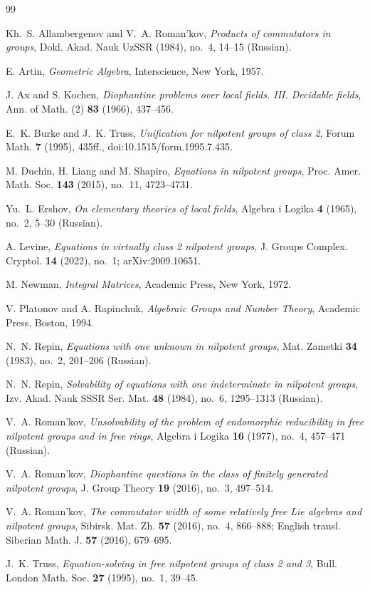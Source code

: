 \documentclass[11pt]{amsart}
\theoremstyle{definition}
\theoremstyle{remark}
\begin{document}
\begin{thebibliography}{99}

Kh.~S. Allambergenov and V.~A. Roman'kov, \emph{Products of commutators in groups},
Dokl. Akad. Nauk UzSSR (1984), no.~4, 14--15 (Russian).

E. Artin, \emph{Geometric Algebra}, Interscience, New York, 1957.

J. Ax and S. Kochen, \emph{Diophantine problems over local fields. III. Decidable
fields}, Ann. of Math. (2) \textbf{83} (1966), 437--456.

E.~K. Burke and J.~K. Truss, \emph{Unification for nilpotent groups of class 2},
Forum Math. \textbf{7} (1995), 435ff., doi:10.1515/form.1995.7.435.

M. Duchin, H. Liang and M. Shapiro, \emph{Equations in nilpotent groups},
Proc. Amer. Math. Soc. \textbf{143} (2015), no.~11, 4723--4731.

Yu.~L. Ershov, \emph{On elementary theories of local fields}, Algebra i Logika
\textbf{4} (1965), no.~2, 5--30 (Russian).

A. Levine, \emph{Equations in virtually class 2 nilpotent groups}, J. Groups
Complex. Cryptol. \textbf{14} (2022), no.~1; arXiv:2009.10651.

M. Newman, \emph{Integral Matrices}, Academic Press, New York, 1972.

V. Platonov and A. Rapinchuk, \emph{Algebraic Groups and Number Theory},
Academic Press, Boston, 1994.

N.~N. Repin, \emph{Equations with one unknown in nilpotent groups}, Mat. Zametki
\textbf{34} (1983), no.~2, 201--206 (Russian).

N.~N. Repin, \emph{Solvability of equations with one indeterminate in nilpotent
groups}, Izv. Akad. Nauk SSSR Ser. Mat. \textbf{48} (1984), no.~6, 1295--1313
(Russian).

V.~A. Roman'kov, \emph{Unsolvability of the problem of endomorphic reducibility in
free nilpotent groups and in free rings}, Algebra i Logika \textbf{16} (1977),
no.~4, 457--471 (Russian).

V.~A. Roman'kov, \emph{Diophantine questions in the class of finitely generated
nilpotent groups}, J. Group Theory \textbf{19} (2016), no.~3, 497--514.

V.~A. Roman'kov, \emph{The commutator width of some relatively free Lie algebras
and nilpotent groups}, Sibirsk. Mat. Zh. \textbf{57} (2016), no.~4, 866--888;
English transl. Siberian Math. J. \textbf{57} (2016), 679--695.

J.~K. Truss, \emph{Equation-solving in free nilpotent groups of class 2 and 3},
Bull. London Math. Soc. \textbf{27} (1995), no.~1, 39--45.

\end{thebibliography}
\end{document}
